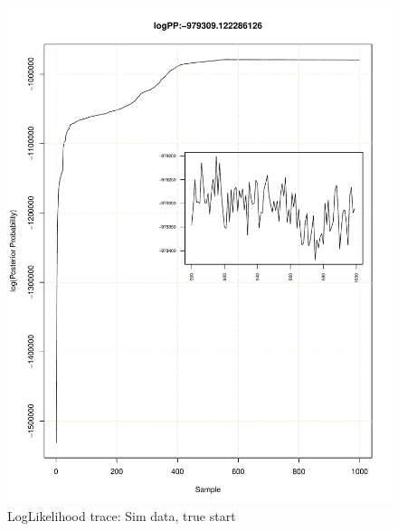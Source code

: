 \documentclass[11pt]{labbook}
\begin{document}
    \begin{figure}
        \centering
        \includegraphics[scale=.65]{FONSE_Plots/2016/October_17/simulated_true_lik}
        \caption{LogLikelihood trace: Sim data, true start}
        \label{fig:OCT17_S.T.LIK}
    \end{figure}
\end{document}
